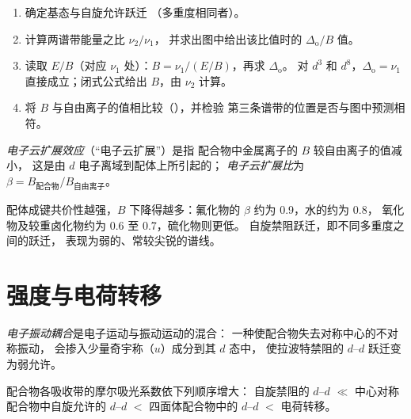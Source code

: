 \begin{method}\label{met:b3:complex-spectra-magnetism:read-ts}
\begin{enumerate}
  \item 确定基态与自旋允许跃迁
        （多重度相同者）。
  \item 计算两谱带能量之比 $\nu_2/\nu_1$，
        并求出图中给出该比值时的 $\Delta_{\mathrm o}/B$ 值。
  \item 读取 $E/B$（对应 $\nu_1$ 处）：$B = \nu_1/(E/B)$，再求 $\Delta_{\mathrm o}$。
        对 $d^3$ 和 $d^8$，$\Delta_{\mathrm o} = \nu_1$ 直接成立；闭式公式给出 $B$，由 $\nu_2$ 计算。
  \item 将 $B$ 与自由离子的值相比较（），并检验
        第三条谱带的位置是否与图中预测相符。
\end{enumerate}
\end{method}

\begin{definition}[电子云扩展效应]\label{def:b3:complex-spectra-magnetism:nephelauxetic}
\emph{电子云扩展效应}（“电子云扩展”）是指
配合物中金属离子的 $B$ 较自由离子的值减小，
这是由 $d$ 电子离域到配体上所引起的；
\emph{电子云扩展比}为 $\beta =
B_{\text{配合物}}/B_{\text{自由离子}}$。
\end{definition}

配体成键共价性越强，$B$ 下降得越多：氟化物的 $\beta$ 约为 0.9，水的约为 0.8，
氧化物及较重卤化物约为 0.6 至 0.7，硫化物则更低。
自旋禁阻跃迁，即不同多重度之间的跃迁，
表现为弱的、常较尖锐的谱线。

\section{强度与电荷转移}

\begin{definition}[电子振动耦合]\label{def:b3:complex-spectra-magnetism:vibronic-coupling}
\emph{电子振动耦合}是电子运动与振动运动的混合：
一种使配合物失去对称中心的不对称振动，
会掺入少量奇宇称（$u$）成分到其 $d$ 态中，
使拉波特禁阻的 $d$--$d$ 跃迁变为弱允许。
\end{definition}

\begin{proposition}[吸收带的强度]\label{prop:b3:complex-spectra-magnetism:intensity-order}
配合物各吸收带的摩尔吸光系数依下列顺序增大：
自旋禁阻的 $d$--$d$ $\ll$ 中心对称配合物中自旋允许的 $d$--$d$ $<$
四面体配合物中的 $d$--$d$ $<$ 电荷转移。
\end{proposition}

